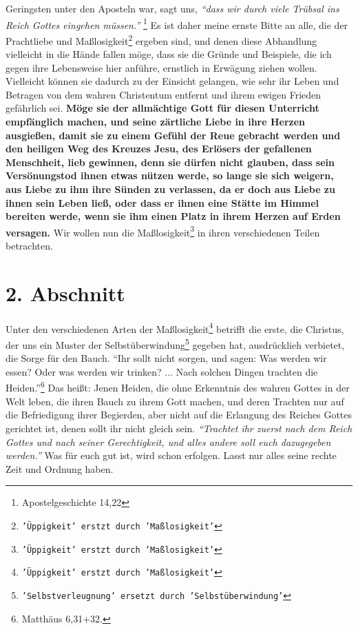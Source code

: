 Geringsten unter den Aposteln war, sagt uns,
\textit{"`dass wir durch viele Trübsal ins
Reich Gottes eingehen müssen."'}
\footnote{Apostelgeschichte 14,22}
Es ist daher meine
ernste Bitte an alle, die der Prachtliebe und
Maßlosigkeit\footnote{\texttt{'Üppigkeit' erstzt durch
'Maßlosigkeit'}} ergeben sind, und
denen diese Abhandlung vielleicht in die Hände fallen möge, dass sie die Gründe
und Beispiele, die ich gegen ihre Lebensweise hier anführe, ernstlich in
Erwägung ziehen wollen. Vielleicht können sie dadurch zu der Einsicht gelangen,
wie sehr ihr Leben und Betragen von dem wahren
Christentum entfernt
und ihrem
ewigen Frieden gefährlich sei.
\label{ref:14_01_wahre_nachfolger_suenetod}
\textbf{Möge sie der allmächtige Gott für diesen
Unterricht empfänglich machen, und seine zärtliche Liebe in ihre Herzen
ausgießen, damit sie zu einem Gefühl der Reue gebracht werden
und den heiligen
Weg des Kreuzes Jesu, des Erlösers der
gefallenen
Menschheit, lieb gewinnen,
denn sie dürfen nicht glauben, dass sein Versönungstod
ihnen etwas nützen werde,
so lange sie sich weigern, aus Liebe zu ihm ihre Sünden zu
verlassen, da er doch
aus Liebe zu ihnen sein Leben ließ, oder dass er ihnen eine Stätte im Himmel
bereiten werde, wenn sie ihm einen Platz in ihrem Herzen auf Erden versagen.}
Wir
wollen nun die Maßlosigkeit\footnote{\texttt{'Üppigkeit' erstzt durch
'Maßlosigkeit'}}
in ihren verschiedenen Teilen betrachten.

\section{2. Abschnitt} \label{kap14_ab2}

Unter den verschiedenen Arten der Maßlosigkeit\footnote{\texttt{'Üppigkeit'
erstzt durch 'Maßlosigkeit'}} betrifft die erste, die Christus,
der uns ein Muster der Selbstüberwindung\footnote{\texttt{'Selbstverleugnung'
ersetzt durch 'Selbstüberwindung'}} gegeben hat, ausdrücklieh verbietet,
die Sorge für den Bauch.
"`Ihr sollt nicht sorgen, und sagen: Was werden wir
essen? Oder was werden wir trinken? ... Nach solchen Dingen trachten die
Heiden."'\footnote{Matthäus 6,31+32.}
Das heißt: Jenen Heiden, die ohne
Erkenntnis des wahren Gottes in der Welt leben, die ihren
Bauch zu ihrem Gott
machen, und deren Trachten nur auf die Befriedigung ihrer
Begierden, aber nicht
auf die Erlangung des Reiches Gottes gerichtet ist, denen
sollt ihr nicht gleich
sein.
\textit{"`Trachtet ihr zuerst nach dem Reich Gottes und nach seiner
Gerechtigkeit, und alles andere soll euch dazugegeben werden."'} Was für euch
gut
ist, wird schon erfolgen. Lasst nur alles seine rechte Zeit
und Ordnung haben.

